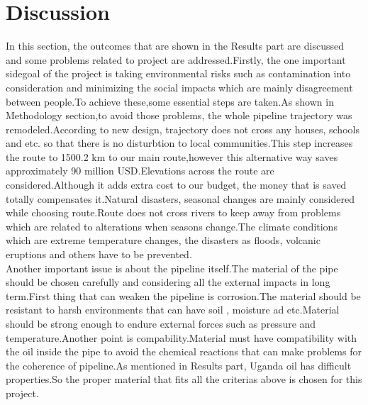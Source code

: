 \documentclass[12pt]{article}
\begin{document}
\section*{Discussion}
{\fontsize{12pt}{12pt}\selectfont
\hspace*{1em}In this section, the outcomes that are shown in the Results part are discussed and some problems related to project are addressed.Firstly, the one important sidegoal of the project is taking environmental risks such as contamination into consideration and minimizing the social impacts which are mainly disagreement between people.To achieve these,some essential steps are taken.As shown in Methodology section,to avoid those problems, the whole pipeline trajectory was remodeled.According to new design, trajectory does not cross any houses, schools and etc. so that there is no disturbtion to local communities.This step increases the route to 1500.2 km to our main route,however this alternative way saves approximately 90 million USD.Elevations across the route are considered.Although it adds extra cost to our budget, the money that is saved totally compensates it.Natural disasters, seasonal changes are mainly considered while choosing route.Route does not cross rivers to keep away from problems which are related to alterations when seasons change.The climate conditions which are extreme temperature changes, the disasters as floods, volcanic eruptions and others have to be prevented.
\\

Another important issue is about the pipeline itself.The material of the pipe should be chosen carefully and considering all the external impacts in long term.First thing that can weaken the pipeline is corrosion.The material should be resistant to harsh environments that can have soil , moisture ad etc.Material should be strong enough to  endure external forces such as pressure and temperature.Another point is compability.Material must have compatibility with the oil inside the pipe to avoid the chemical reactions that can make problems for the coherence of pipeline.As mentioned in Results part, Uganda oil has difficult properties.So the proper material that fits all the criterias above is chosen for this project.
\\

}
\end{document}
